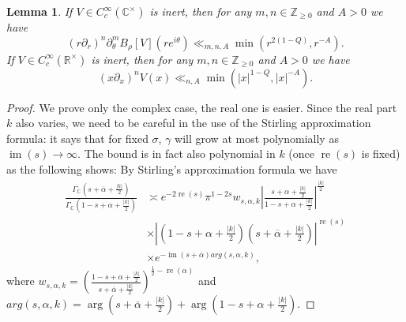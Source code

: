 \documentclass[a4paper,11pt]{amsart}
\newtheorem{lemma}[theorem]{Lemma}
\theoremstyle{definition}
\newcommand{\R}{\mathbb{R}}
\newcommand{\Z}{\mathbb{Z}}
\newcommand{\real}{\operatorname{re}}
\newcommand{\CC}{\mathbb{C}}
\begin{document}
\begin{lemma}
If $V \in C_c^{\infty}(\CC^{\times})$ is inert, then for any $m,n \in \Z_{\geq 0}$ and $A>0$ we have
\begin{equation}\label{eq:decaybesselforinert}(r\partial_r)^n\partial_{\theta}^mB_{\rho}[V](re^{i\theta}) \ll_{m,n,A}  \min(r^{2(1-Q)},r^{-A}).\end{equation}
If $V\in C_c^{\infty}(\R^{\times})$ is inert, then for any $m,n \in \Z_{\geq0 }$ and $A>0$ we have 
\begin{equation}\label{eq:decaybesselinert2}
    (x\partial_x)^nV(x) \ll_{n,A} \min(\vert x\vert^{1-Q},\vert x \vert^{-A}).
\end{equation}
\end{lemma}


\begin{proof}We prove only the complex case, the real one is easier. Since the real part $k$ also varies, we need to be careful in the use of the Stirling approximation formula: it says that for fixed $\sigma$, $\gamma$ will grow at most polynomially as  $\operatorname{im}(s)\to \infty$. The bound is in fact also polynomial in $k$ (once $\real(s)$ is fixed) as the following shows: By Stirling's approximation formula we have 
    \begin{align*}
    \frac{\Gamma_{\CC}\left(s+\overline{\alpha}+\frac{\vert{k}\vert}{2}\right)}{\Gamma_{\CC}\left(1-s+\alpha+\frac{\vert{k}\vert}{2}\right)} & \asymp e^{-2\real(s)}\pi^{1-2s}w_{s,\alpha,k}\left\vert{\frac{s+\alpha+\frac{\vert{k}\vert}{2}}{1-s+\alpha+\frac{\vert{k}\vert}{2}}}\right\vert^{\frac{\vert{k}\vert}{2}}\\&\times\left\vert{\left(1-s+\alpha+\frac{\vert{k}\vert}{2}\right)\left(s+\overline{\alpha}+\frac{\vert{k}\vert}{2}\right)}\right\vert^{\real(s)}\\&\times e^{-\operatorname{im}(s+\overline{\alpha})arg(s,\alpha,k)},
    \end{align*}
    where $w_{s,\alpha,k}=\left(\frac{1-s+\alpha+\frac{\vert{k}\vert}{2}}{s+\overline{\alpha}+\frac{\vert{k}\vert}{2}}\right)^{\frac{1}{2}-\real(\alpha)}$ and $arg(s,\alpha,k) = \operatorname{arg}(s+\overline{\alpha}+\frac{\vert{k}\vert}{2})+\operatorname{arg}(1-s+\alpha+\frac{\vert{k}\vert}{2})$.
  

\end{proof}
\end{document}
